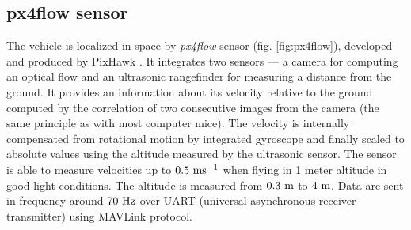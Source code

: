 \subsection{px4flow sensor}
\label{cap:px4flow}

The vehicle is localized in space by \textit{px4flow} sensor \citep{px4flow} (fig. \ref{fig:px4flow}), developed and produced by PixHawk \citep{pixhawk}. It integrates two sensors --- a camera for computing an optical flow and an ultrasonic rangefinder for measuring a distance from the ground. It provides an information about its velocity relative to the ground computed by the correlation of two consecutive images from the camera (the same principle as with most computer mice). The velocity is internally compensated from rotational motion by integrated gyroscope and finally scaled to absolute values using the altitude measured by the ultrasonic sensor. The sensor is able to measure velocities up to $0.5~\mathrm{ms^{-1}}$ when flying in 1 meter altitude in good light conditions. The altitude is measured from $0.3~\mathrm{m}$ to $4~\mathrm{m}$. Data are sent in frequency around $70~\mathrm{Hz}$ over UART (universal asynchronous receiver-transmitter) using MAVLink protocol.

